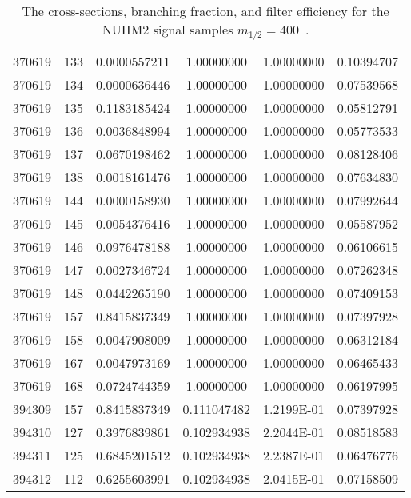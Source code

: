 \begin{table}[htp]
{{\begin{tabular}{cccccc}
                370619 & 133         & 0.0000557211         & 1.00000000  & 1.00000000        & 0.10394707\\
                370619 & 134         & 0.0000636446         & 1.00000000  & 1.00000000        & 0.07539568\\
                370619 & 135         & 0.1183185424         & 1.00000000  & 1.00000000        & 0.05812791\\
                370619 & 136         & 0.0036848994         & 1.00000000  & 1.00000000        & 0.05773533\\
                370619 & 137         & 0.0670198462         & 1.00000000  & 1.00000000        & 0.08128406\\
                370619 & 138         & 0.0018161476         & 1.00000000  & 1.00000000        & 0.07634830\\
                370619 & 144         & 0.0000158930         & 1.00000000  & 1.00000000        & 0.07992644\\
                370619 & 145         & 0.0054376416         & 1.00000000  & 1.00000000        & 0.05587952\\
                370619 & 146         & 0.0976478188         & 1.00000000  & 1.00000000        & 0.06106615\\
                370619 & 147         & 0.0027346724         & 1.00000000  & 1.00000000        & 0.07262348\\
                370619 & 148         & 0.0442265190         & 1.00000000  & 1.00000000        & 0.07409153\\
                370619 & 157         & 0.8415837349         & 1.00000000  & 1.00000000        & 0.07397928\\
                370619 & 158         & 0.0047908009         & 1.00000000  & 1.00000000        & 0.06312184\\
                370619 & 167         & 0.0047973169         & 1.00000000  & 1.00000000        & 0.06465433\\
                370619 & 168         & 0.0724744359         & 1.00000000  & 1.00000000        & 0.06197995\\ 
                394309 & 157         & 0.8415837349         & 0.111047482 & 1.2199E-01        & 0.07397928\\
                394310 & 127         & 0.3976839861         & 0.102934938 & 2.2044E-01        & 0.08518583\\
                394311 & 125         & 0.6845201512         & 0.102934938 & 2.2387E-01        & 0.06476776\\
                394312 & 112         & 0.6255603991         & 0.102934938 & 2.0415E-01        & 0.07158509\\
                \hline
                \hline
            \end{tabular}
        }
    }
    \caption{The cross-sections, branching fraction, and filter efficiency for the NUHM2 signal samples $m_{1/2} = 400$~{\GeV}.}
    \label{tab:app_xsec_m12_400}
\end{table}%

